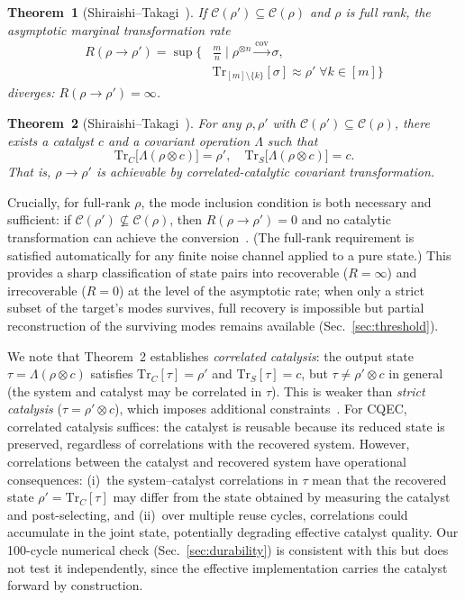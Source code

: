 \documentclass[a4paper,twocolumn]{quantumarticle}
\begin{document}
\textbf{Theorem~1} (Shiraishi--Takagi~\cite{Shiraishi2024}).
\emph{If $\mathcal{C}(\rho') \subseteq \mathcal{C}(\rho)$ and $\rho$ is full rank, the asymptotic marginal transformation rate}
\begin{equation*}
\begin{aligned}
R(\rho \to \rho') = \sup \Big\{ &\tfrac{m}{n} \mid \rho^{\otimes n} \xrightarrow{\mathrm{cov}} \sigma,\\
&\mathrm{Tr}_{[m]\setminus\{k\}}[\sigma] \approx \rho' \;\forall k \in [m] \Big\}
\end{aligned}
\end{equation*}
\emph{diverges: $R(\rho \to \rho') = \infty$.}

\textbf{Theorem~2} (Shiraishi--Takagi~\cite{Shiraishi2024}).
\emph{For any $\rho, \rho'$ with $\mathcal{C}(\rho') \subseteq \mathcal{C}(\rho)$, there exists a catalyst $c$ and a covariant operation $\Lambda$ such that}
\begin{equation}
\mathrm{Tr}_C\bigl[\Lambda(\rho \otimes c)\bigr] = \rho', \quad \mathrm{Tr}_S\bigl[\Lambda(\rho \otimes c)\bigr] = c.
\label{eq:catalytic}
\end{equation}
\emph{That is, $\rho \to \rho'$ is achievable by correlated-catalytic covariant transformation.}

Crucially, for full-rank $\rho$, the mode inclusion condition is both necessary and sufficient: if $\mathcal{C}(\rho') \not\subseteq \mathcal{C}(\rho)$, then $R(\rho \to \rho') = 0$ and no catalytic transformation can achieve the conversion~\cite{Shiraishi2024}.
(The full-rank requirement is satisfied automatically for any finite noise channel applied to a pure state.)
This provides a sharp classification of state pairs into recoverable ($R = \infty$) and irrecoverable ($R = 0$) at the level of the asymptotic rate; when only a strict subset of the target's modes survives, full recovery is impossible but partial reconstruction of the surviving modes remains available (Sec.~\ref{sec:threshold}).

We note that Theorem~2 establishes \emph{correlated catalysis}: the output state $\tau = \Lambda(\rho \otimes c)$ satisfies $\mathrm{Tr}_C[\tau] = \rho'$ and $\mathrm{Tr}_S[\tau] = c$, but $\tau \neq \rho' \otimes c$ in general (the system and catalyst may be correlated in $\tau$).
This is weaker than \emph{strict catalysis} ($\tau = \rho' \otimes c$), which imposes additional constraints~\cite{Shiraishi2024}.
For CQEC, correlated catalysis suffices: the catalyst is reusable because its reduced state is preserved, regardless of correlations with the recovered system.
However, correlations between the catalyst and recovered system have operational consequences: (i)~the system--catalyst correlations in $\tau$ mean that the recovered state $\rho' = \mathrm{Tr}_C[\tau]$ may differ from the state obtained by measuring the catalyst and post-selecting, and (ii)~over multiple reuse cycles, correlations could accumulate in the joint state, potentially degrading effective catalyst quality.
Our 100-cycle numerical check (Sec.~\ref{sec:durability}) is consistent with this but does not test it independently, since the effective implementation carries the catalyst forward by construction.
\end{document}
